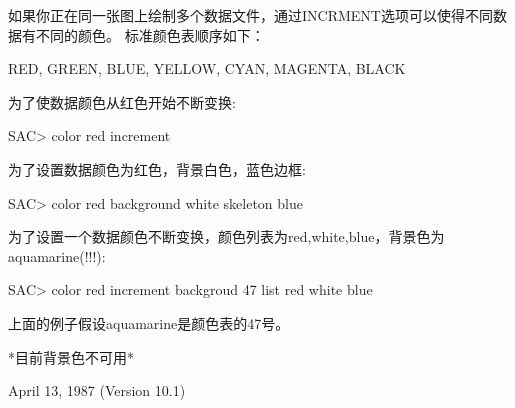 如果你正在同一张图上绘制多个数据文件，通过INCRMENT选项可以使得不同数据有不同的颜色。
标准颜色表顺序如下：

RED, GREEN, BLUE, YELLOW, CYAN, MAGENTA, BLACK

为了使数据颜色从红色开始不断变换:
\begin{SACCode}
SAC> color red increment
\end{SACCode}
为了设置数据颜色为红色，背景白色，蓝色边框:
\begin{SACCode}
SAC> color red background white skeleton blue
\end{SACCode}
为了设置一个数据颜色不断变换，颜色列表为red,white,blue，背景色为aquamarine(!!!):
\begin{SACCode}
SAC> color red increment backgroud 47 list red white blue
\end{SACCode}
上面的例子假设aquamarine是颜色表的47号。

*目前背景色不可用*

April 13, 1987 (Version 10.1)
